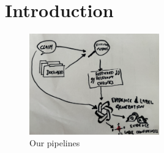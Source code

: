 
\section{Introduction}
\label{sec:introduction}

\begin{figure}[h]
    \centering
    \includegraphics[width=0.5\textwidth]{figures/pipeline.pdf}
    \caption{Our pipelines}
    \label{fig:pipeline}
\end{figure}


